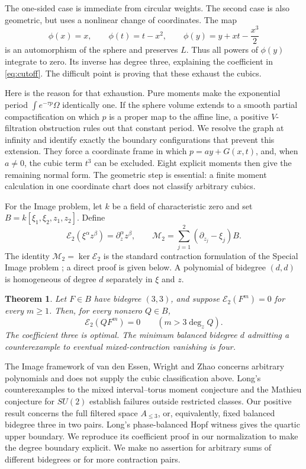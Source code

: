 \documentclass[11pt]{article}
\newcommand{\E}{\mathcal E_2}
\newtheorem{theorem}{Theorem}[section]
\theoremstyle{remark}\newtheorem{remark}[theorem]{Remark}
\begin{document}
The one-sided case is immediate from circular weights. The second case
is also geometric, but uses a nonlinear change of coordinates. The map
\begin{equation}\label{eq:shear}
 \phi(x)=x,\qquad \phi(t)=t-x^2,\qquad
 \phi(y)=y+xt-\frac{x^3}{2}
\end{equation}
is an automorphism of the sphere and preserves \(L\).
Thus all powers of \(\phi(y)\) integrate to zero. Its inverse has degree
three, explaining the coefficient in \eqref{eq:cutoff}. The difficult
point is proving that these exhaust the cubics.

Here is the reason for that exhaustion. Pure moments make the
exponential period \(\int e^{-\tau p}\Omega\) identically one. If the
sphere volume extends to a smooth partial compactification on which \(p\) is a
proper map to the affine line, a positive \(V\)-filtration obstruction
rules out that constant period. We resolve the graph at infinity and
identify exactly the boundary configurations that prevent this
extension. They force a coordinate frame in which \(p=ay+G(x,t)\),
and, when \(a\ne0\), the cubic term \(t^3\) can be excluded. Eight
explicit moments then give the remaining normal form. The geometric
step is essential: a finite moment calculation in one coordinate chart
does not classify arbitrary cubics.

For the Image problem, let \(k\) be a field of characteristic zero and
set \(B=k[\xi_1,\xi_2,z_1,z_2]\). Define
\[
 \E(\xi^\alpha z^\beta)=\partial_z^\alpha z^\beta,
 \qquad
 \mathcal M_2=\sum_{j=1}^2(\partial_{z_j}-\xi_j)B.
\]
The identity \(\mathcal M_2=\ker\E\) is the standard contraction
formulation of the Special Image problem
\cite[Section~3]{EWZ11}; a direct proof is given below.
A polynomial of bidegree \((d,d)\) is homogeneous of degree \(d\)
separately in \(\xi\) and \(z\).

\begin{theorem}\label{thm:image}
Let \(F\in B\) have bidegree \((3,3)\), and suppose
\(\E(F^m)=0\) for every \(m\geq1\). Then, for every nonzero \(Q\in B\),
\[
 \E(QF^m)=0\qquad(m>3\deg_z Q).
\]
The coefficient three is optimal. The minimum balanced bidegree
\(d\) admitting a counterexample to eventual mixed-contraction
vanishing is four.
\end{theorem}

The Image framework of van den Essen, Wright and Zhao
\cite{EWZ11} concerns arbitrary polynomials and does not supply the
cubic classification above. Long's counterexamples to the mixed
interval--torus moment conjecture and the Mathieu conjecture for
\(SU(2)\) \cite{Long26} establish failures outside restricted
classes. Our positive result concerns the full filtered space
\(A_{\leq3}\), or, equivalently, fixed balanced bidegree three in two
pairs. Long's phase-balanced Hopf witness \cite[Theorem~3.1]{LongHopf26} gives the quartic upper boundary. We reproduce its coefficient proof in our normalization to make the degree
boundary explicit. We make no assertion for arbitrary sums of different
bidegrees or for more contraction pairs.
\end{document}
